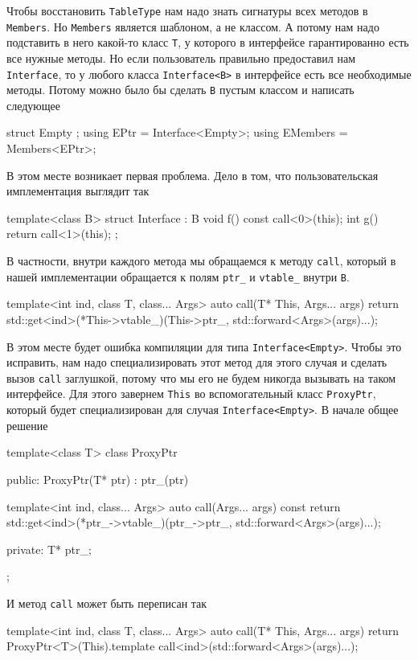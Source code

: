 Чтобы восстановить \verb"TableType" нам надо знать сигнатуры всех методов в \verb"Members".
Но \verb"Members" является шаблоном, а не классом.
А потому нам надо подставить в него какой-то класс \verb"T", у которого в интерфейсе гарантированно есть все нужные методы.
Но если пользователь правильно предоставил нам \verb"Interface", то у любого класса \verb"Interface<B>" в интерфейсе есть все необходимые методы.
Потому можно было бы сделать \verb"B" пустым классом и написать следующее
\begin{cppcode}
struct Empty {};
using EPtr = Interface<Empty>;
using EMembers = Members<EPtr>;
\end{cppcode}
В этом месте возникает первая проблема.
Дело в том, что пользовательская имплементация выглядит так
\begin{cppcode}
template<class B>
struct Interface : B {
  void f() const  {
    call<0>(this);
  }
  int g() {
    return call<1>(this);
  }
};
\end{cppcode}
В частности, внутри каждого метода мы обращаемся к методу \verb"call", который в нашей имплементации обращается к полям \verb"ptr_" и \verb"vtable_" внутри \verb"B".
\begin{cppcode}[numbers = none]
template<int ind, class T, class... Args>
auto call(T* This, Args... args) {
  return std::get<ind>(*This->vtable_)(This->ptr_, std::forward<Args>(args)...);
}
\end{cppcode}
В этом месте будет ошибка компиляции для типа \verb"Interface<Empty>".
Чтобы это исправить, нам надо специализировать этот метод для этого случая и сделать вызов \verb"call" заглушкой, потому что мы его не будем никогда вызывать на таком интерфейсе.
Для этого завернем \verb"This" во вспомогательный класс \verb"ProxyPtr", который будет специализирован для случая \verb"Interface<Empty>".
В начале общее решение
\begin{cppcode}
template<class T>
class ProxyPtr {
public:
  ProxyPtr(T* ptr) : ptr_(ptr) {
  }

  template<int ind, class... Args>
  auto call(Args... args) const {
    return std::get<ind>(*ptr_->vtable_)(ptr_->ptr_, std::forward<Args>(args)...);
  }

private:
  T* ptr_;
};
\end{cppcode}
И метод \verb"call" может быть переписан так
\begin{cppcode}
template<int ind, class T, class... Args>
auto call(T* This, Args... args) {
  return ProxyPtr<T>(This).template call<ind>(std::forward<Args>(args)...);
}
\end{cppcode}
